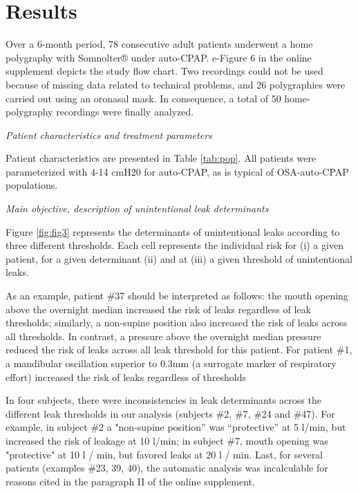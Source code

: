 \section{Results}
\textbf{}
\hspace{\par}
Over a 6-month period, 78 consecutive adult patients underwent a home polygraphy with Somnolter® under auto-CPAP. e-Figure 6 in the online supplement depicts the study flow chart. Two recordings could not be used because of missing data related to technical problems, and 26 polygraphies were carried out using an oronasal mask. In consequence, a total of 50 home-polygraphy recordings were finally analyzed.
\newline

\textit{Patient characteristics and treatment parameters}

Patient characteristics are presented in Table \ref{tab:pop}. All patients were parameterized with 4-14 cmH20 for auto-CPAP, as is typical of OSA-auto-CPAP populations. 
\newline

\textit{Main objective, description of unintentional leak determinants}

Figure \ref{fig:fig3} represents the determinants of unintentional leaks according to three different thresholds. Each cell represents the individual risk for (i) a given patient, for a given determinant (ii) and at (iii) a given threshold of unintentional leaks.

As an example, patient \#37 should be interpreted as follows: the mouth opening above the overnight median increased the risk of leaks regardless of leak thresholds; similarly, a non-supine position also increased the risk of leaks across all thresholds. In contrast, a pressure above the overnight median pressure reduced the risk of leaks across all leak threshold for this patient. For patient \#1, a mandibular oscillation superior to 0.3mm (a surrogate marker of respiratory effort) increased the risk of leaks regardless of thresholds

In four subjects, there were inconsistencies in leak determinants across the different leak thresholds in our analysis (subjects \#2, \#7, \#24 and \#47). For example, in subject \#2 a "non-supine position” was “protective” at 5 l/min, but increased the risk of leakage at 10 l/min; in subject \#7, mouth opening was "protective" at 10 l / min, but favored leaks at 20 l / min. Last, for several patients (examples \#23, 39, 40), the automatic analysis was incalculable for reasons cited in the paragraph II of the online supplement.
\newline

